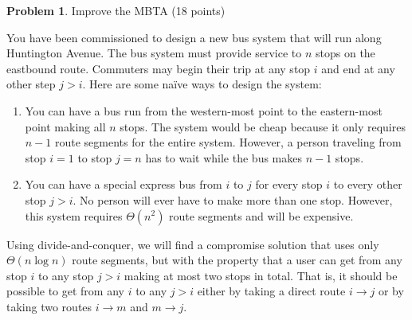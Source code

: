 \documentclass[11pt]{article}
\theoremstyle{definition}
\theoremstyle{theorem}
\newtheorem{prob}{Problem}
\begin{document}
\begin{prob}Improve the MBTA (18 points) \end{prob}
You have been commissioned to design a new bus system that will run along Huntington Avenue.  The bus system must provide service to $n$ stops on the eastbound route.  Commuters may begin their trip at any stop $i$ and end at any other step $j > i$.  Here are some na\"ive ways to design the system:
\begin{enumerate}
\item You can have a bus run from the western-most point to the eastern-most point making all $n$ stops. The system would be cheap because it only requires $n-1$ route segments for the entire system. However, a person traveling from stop $i=1$ to stop $j=n$ has to wait while the bus makes $n-1$ stops.

\item You can have a special express bus from $i$ to $j$ for every stop $i$ to every other stop $j > i$. No person will ever have to make more than one stop.  However, this system requires $\Theta(n^2)$ route segments and will be expensive.
\end{enumerate}

Using divide-and-conquer, we will find a compromise solution that uses only $\Theta(n \log n)$ route segments, but with the property that a user can get from any stop $i$ to any stop $j > i$ making at most two stops in total.  That is, it should be possible to get from any $i$ to any $j > i$ either by taking a direct route $i \to j$ or by taking two routes $i \to m$ and $m \to j$.
\end{document}
